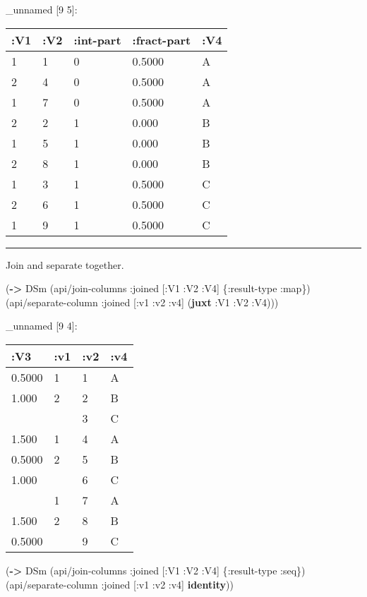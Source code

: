 \documentclass[]{article}
\newenvironment{Shaded}{\begin{snugshade}}{\end{snugshade}}
\newcommand{\KeywordTok}[1]{\textcolor[rgb]{0.13,0.29,0.53}{\textbf{#1}}}
\newcommand{\AttributeTok}[1]{\textcolor[rgb]{0.77,0.63,0.00}{#1}}
\newcommand{\NormalTok}[1]{#1}
\begin{document}
\_unnamed {[}9 5{]}:

\begin{longtable}[]{@{}lllll@{}}
\toprule
:V1 & :V2 & :int-part & :fract-part & :V4\tabularnewline
\midrule
\endhead
1 & 1 & 0 & 0.5000 & A\tabularnewline
2 & 4 & 0 & 0.5000 & A\tabularnewline
1 & 7 & 0 & 0.5000 & A\tabularnewline
2 & 2 & 1 & 0.000 & B\tabularnewline
1 & 5 & 1 & 0.000 & B\tabularnewline
2 & 8 & 1 & 0.000 & B\tabularnewline
1 & 3 & 1 & 0.5000 & C\tabularnewline
2 & 6 & 1 & 0.5000 & C\tabularnewline
1 & 9 & 1 & 0.5000 & C\tabularnewline
\bottomrule
\end{longtable}

\begin{center}\rule{0.5\linewidth}{0.5pt}\end{center}

Join and separate together.

\begin{Shaded}
\begin{Highlighting}[]
\NormalTok{(}\KeywordTok{->}\NormalTok{ DSm}
\NormalTok{    (api/join-columns }\AttributeTok{:joined}\NormalTok{ [}\AttributeTok{:V1} \AttributeTok{:V2} \AttributeTok{:V4}\NormalTok{] \{}\AttributeTok{:result-type} \AttributeTok{:map}\NormalTok{\})}
\NormalTok{    (api/separate-column }\AttributeTok{:joined}\NormalTok{ [}\AttributeTok{:v1} \AttributeTok{:v2} \AttributeTok{:v4}\NormalTok{] (}\KeywordTok{juxt} \AttributeTok{:V1} \AttributeTok{:V2} \AttributeTok{:V4}\NormalTok{)))}
\end{Highlighting}
\end{Shaded}

\_unnamed {[}9 4{]}:

\begin{longtable}[]{@{}llll@{}}
\toprule
:V3 & :v1 & :v2 & :v4\tabularnewline
\midrule
\endhead
0.5000 & 1 & 1 & A\tabularnewline
1.000 & 2 & 2 & B\tabularnewline
& & 3 & C\tabularnewline
1.500 & 1 & 4 & A\tabularnewline
0.5000 & 2 & 5 & B\tabularnewline
1.000 & & 6 & C\tabularnewline
& 1 & 7 & A\tabularnewline
1.500 & 2 & 8 & B\tabularnewline
0.5000 & & 9 & C\tabularnewline
\bottomrule
\end{longtable}

\begin{Shaded}
\begin{Highlighting}[]
\NormalTok{(}\KeywordTok{->}\NormalTok{ DSm}
\NormalTok{    (api/join-columns }\AttributeTok{:joined}\NormalTok{ [}\AttributeTok{:V1} \AttributeTok{:V2} \AttributeTok{:V4}\NormalTok{] \{}\AttributeTok{:result-type} \AttributeTok{:seq}\NormalTok{\})}
\NormalTok{    (api/separate-column }\AttributeTok{:joined}\NormalTok{ [}\AttributeTok{:v1} \AttributeTok{:v2} \AttributeTok{:v4}\NormalTok{] }\KeywordTok{identity}\NormalTok{))}
\end{Highlighting}
\end{Shaded}
\end{document}
